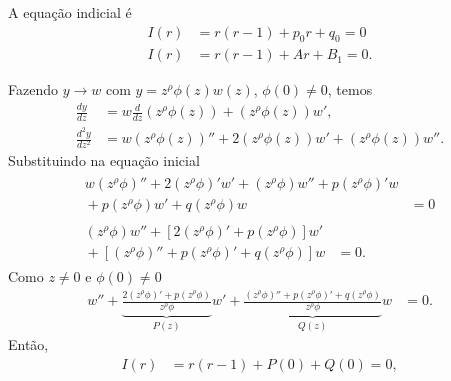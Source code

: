 \documentclass[a4paper,12pt, leqno, answers]{exam}
\begin{document}
\begin{questions}
\begin{solution}
        A equa\c{c}\~{a}o indicial \'{e}
        \begin{align*}
            I(r) &= r\left( r - 1 \right) + p_0 r + q_0 = 0 \\
            I(r) &= r\left( r - 1 \right) + A r + B_1 = 0.
        \end{align*}

        Fazendo $y \to w$ com $y = z^\rho \phi\left( z \right) w\left( z \right)$, $\phi\left( 0 \right) \neq 0$, temos
        \begin{align*}
            \frac{d y}{d z} &= w \frac{d}{d z}\left( z^\rho \phi\left( z \right) \right) + \left(z^\rho \phi \left(z\right)\right) w', \\
            \frac{d^2 y}{d z^2} &= w\left( z^\rho \phi\left( z \right) \right)'' + 2 \left( z^\rho \phi \left(z\right) \right) w' + \left( z^\rho \phi \left(z\right) \right) w''.
        \end{align*}
        Substituindo na equa\c{c}\~{a}o inicial
        \begin{align*}
            \begin{split}
                w \left( z^\rho \phi \right)'' + 2 \left( z^\rho \phi \right)' w' + \left( z^\rho \phi \right) w'' + p \left( z^\rho \phi \right)' w \\ {}+ p \left( z^\rho \phi \right) w' + q \left( z^\rho \phi \right) w &= 0
            \end{split} \\
            \begin{split}
                \left( z^\rho \phi \right) w'' + \left[ 2 \left( z^\rho \phi \right)' + p \left( z^\rho \phi \right) \right] w' \\ {}+ \left[ \left( z^\rho \phi \right)'' + p \left( z^\rho \phi \right)' + q \left( z^\rho \phi \right) \right] w &= 0.
            \end{split}
        \end{align*}
        Como $z \neq 0$ e $\phi(0) \neq 0$
        \begin{align*}
            w'' + \underbrace{\frac{2\left( z^\rho \phi \right)' + p \left( z^\rho \phi \right)}{z^\rho \phi}}_{P(z)} w' + \underbrace{\frac{\left( z^\rho \phi \right)'' + p \left( z^\rho \phi \right)' + q\left( z^\rho \phi \right)}{z^\rho \phi}}_{Q(z)} w &= 0.
        \end{align*}
        Ent\~{a}o,
        \begin{align*}
            I(r) &= r \left( r - 1 \right) + P(0) + Q(0) = 0, \\

\end{align*}
\end{solution}
\end{questions}
\end{document}
